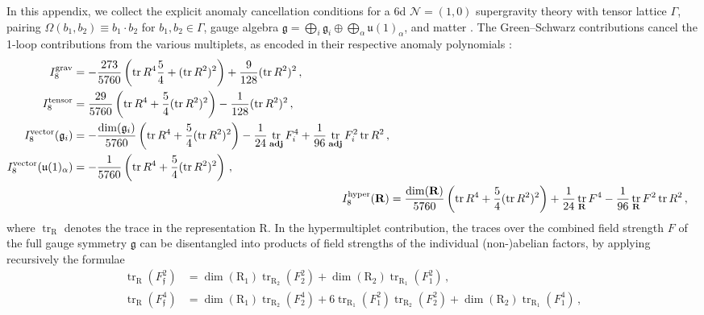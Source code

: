 \documentclass[11pt, a4paper]{article}
\newcommand*{\cN}{\ensuremath{\mathcal{N}}}
\newcommand*{\fkf}{\ensuremath{\mathfrak{f}}}
\newcommand*{\fkg}{\ensuremath{\mathfrak{g}}}
\newcommand*{\fku}{\ensuremath{\mathfrak{u}}}
\DeclareMathOperator{\trace}{tr}
\newcommand*{\birrep}{\ensuremath{\bm{\mathrm{R}}}}
\begin{document}
In this appendix, we collect the explicit anomaly cancellation conditions for a 6d $\cN = (1, 0)$ supergravity theory with tensor lattice $\Gamma$, pairing $\Omega(b_1, b_2) \equiv b_1 \cdot b_2$ for $b_1, b_2 \in \Gamma$, gauge algebra $\fkg = \bigoplus_i \fkg_i \oplus \bigoplus_\alpha \fku(1)_\alpha$, and matter  \cite{Erler:1993zy,Green:1984bx,Sagnotti:1992qw,Park:2011ji}. 
The Green--Schwarz contributions cancel the 1-loop contributions from the various multiplets, as encoded in their respective anomaly polynomials \cite{Alvarez-Gaume:1983ihn}:
\begin{align}
    \begin{split}
        I^\text{grav}_8 & = -\frac{273}{5760} \left(\trace R^4 \frac54 + (\trace R^2)^2 \right) + \frac{9}{128} (\trace R^2)^2 \, , \\
        I^\text{tensor}_8 & = \frac{29}{5760} \left(\trace R^4 + \frac54 (\trace R^2)^2 \right) - \frac{1}{128} (\trace R^2)^2 \, , \\
        I_8^\text{vector}(\fkg_i) & = -\frac{\dim (\fkg_i)}{5760} \left(\trace R^4 + \frac54 (\trace R^2)^2 \right) - \frac{1}{24} \trace_{\bf adj} F_i^4 + \frac{1}{96} \trace_{\bf adj} F_i^2 \trace R^2 \, , \\
        I_8^\text{vector}(\fku(1)_\alpha) & = -\frac{1}{5760} \left( \trace R^4 + \frac54 (\trace R^2)^2 \right) \, ,
    \end{split} \label{eq:1-loop_contributions} \\
        I^\text{hyper}_8(\birrep) & = \frac{\dim (\birrep)}{5760} \left( \trace R^4 + \frac54 (\trace R^2)^2 \right) + \frac{1}{24} \trace_{\birrep} F^4 - \frac{1}{96} \trace_{\birrep} F^2 \trace R^2 \, ,
        \label{eq:hyper_1-loop}
\end{align}
where $\trace_{\birrep}$ denotes the trace in the representation $\birrep$.
In the hypermultiplet contribution, the traces over the combined field strength $F$ of the full gauge symmetry $\fkg$ can be disentangled into products of field strengths of the individual (non-)abelian factors, by applying recursively the formulae
\begin{align}\label{eq:decomposing_trace_non-ab}
    \trace_{\birrep}(F_\fkf^2) &= \dim(\birrep_1) \trace_{\birrep_2}(F_2^2) + \dim(\birrep_2) \trace_{\birrep_1}(F_1^2) \, , \\
    \trace_{\birrep}(F_\fkf^4) &= \dim(\birrep_1) \trace_{\birrep_2}(F_2^4) + 6 \trace_{\birrep_1}(F_1^2) \trace_{\birrep_2}(F_2^2) + \dim(\birrep_2) \trace_{\birrep_1}(F_1^4) \, ,
\end{align}
\end{document}
